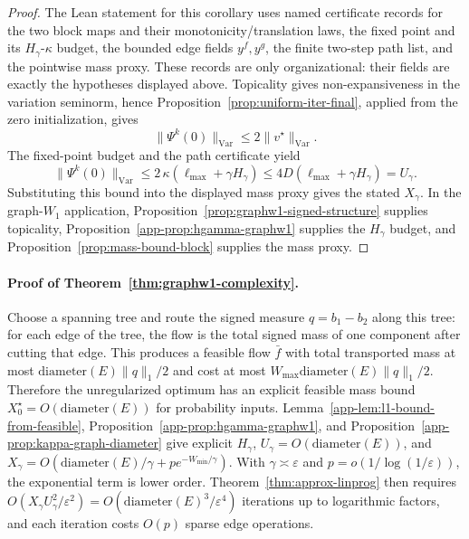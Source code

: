 \documentclass{article}
\theoremstyle{plain}
\newcommand{\Edge}{E}
\newcommand{\length}{W}
\newcommand{\norm}[1]{\|#1\|}
\newcommand{\normVar}[1]{\norm{#1}_{\mathrm{Var}}}
\begin{document}
\begin{proof}
The Lean statement for this corollary uses named certificate records for the
two block maps and their monotonicity/translation laws, the fixed point and its
\(H_\gamma\)-\(\kappa\) budget, the bounded edge fields \(y^f,y^g\), the
finite two-step path list, and the pointwise mass proxy.  These records are
only organizational: their fields are exactly the hypotheses displayed above.
Topicality gives non-expansiveness in the
variation seminorm, hence Proposition~\ref{prop:uniform-iter-final}, applied
from the zero initialization, gives
\[
  \normVar{\Psi^k(0)}\le2\normVar{v^\star}.
\]
The fixed-point budget and the path certificate yield
\[
  \normVar{\Psi^k(0)}
  \le2\,\kappa(\ell_{\max}+\gamma H_\gamma)
  \le4D(\ell_{\max}+\gamma H_\gamma)=U_\gamma .
\]
Substituting this bound into the displayed mass proxy gives the stated
$X_\gamma$.  In the graph-$W_1$ application,
Proposition~\ref{prop:graphw1-signed-structure} supplies topicality,
Proposition~\ref{app-prop:hgamma-graphw1} supplies the $H_\gamma$ budget, and
Proposition~\ref{prop:mass-bound-block} supplies the mass proxy.
\end{proof}

\paragraph{Proof of Theorem~\ref{thm:graphw1-complexity}.}
Choose a spanning tree and route the signed measure $q=b_1-b_2$ along this tree: for each edge of the tree, the flow is the total signed mass of one component after cutting that edge. This produces a feasible flow $\bar f$ with total transported mass at most $\mathrm{diameter}(\Edge)\|q\|_1/2$ and cost at most $\length_{\max}\mathrm{diameter}(\Edge)\|q\|_1/2$. Therefore the unregularized optimum has an explicit feasible mass bound $X_0^\star=O(\mathrm{diameter}(\Edge))$ for probability inputs. Lemma~\ref{app-lem:l1-bound-from-feasible}, Proposition~\ref{app-prop:hgamma-graphw1}, and Proposition~\ref{app-prop:kappa-graph-diameter} give explicit $H_\gamma$, $U_\gamma=O(\mathrm{diameter}(\Edge))$, and $X_\gamma=O(\mathrm{diameter}(\Edge)/\gamma+p e^{-\length_{\min}/\gamma})$. With $\gamma\asymp\varepsilon$ and $p=o(1/\log(1/\varepsilon))$, the exponential term is lower order. Theorem~\ref{thm:approx-linprog} then requires $O(X_\gamma U_\gamma^2/\varepsilon^2)=O(\mathrm{diameter}(\Edge)^3/\varepsilon^4)$ iterations up to logarithmic factors, and each iteration costs $O(p)$ sparse edge operations.
\end{document}

